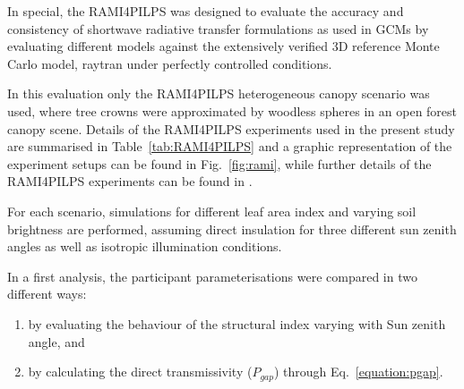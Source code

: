 In special, the RAMI4PILPS \citep{Widlowski2011} was designed to evaluate the accuracy and consistency of shortwave radiative transfer formulations as used in GCMs by evaluating different models against the extensively verified 3D reference Monte Carlo model, raytran \citep{Govaerts1995} under perfectly controlled conditions.

In this evaluation only the RAMI4PILPS heterogeneous canopy scenario was used, where tree crowns were approximated by woodless spheres in an open forest canopy scene. Details of the RAMI4PILPS experiments used in the present study are summarised in Table~\ref{tab:RAMI4PILPS} and a graphic representation of the experiment setups can be found in Fig.~\ref{fig:rami}, while further details of the RAMI4PILPS experiments can be found in \citet{Widlowski2011}. 

For each scenario, simulations for different leaf area index and varying soil brightness are performed, assuming direct insulation for three different sun zenith angles as well as isotropic illumination conditions.

In a first analysis, the participant parameterisations were compared in two different ways:
\begin{enumerate}[i]
 \item by evaluating the behaviour of the structural index varying with Sun zenith angle, and
 \item by calculating the direct transmissivity ($P_{gap}$) through Eq.~\ref{equation:pgap}.
\end{enumerate}

